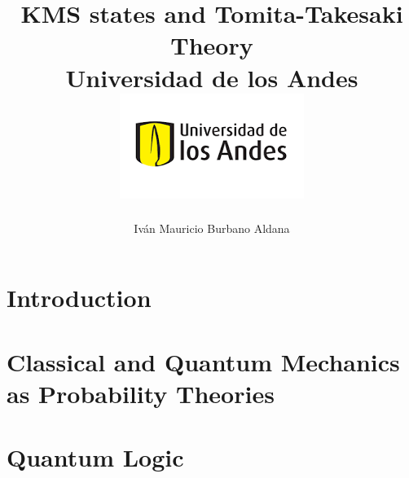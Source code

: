 \documentclass[12pt]{report}
\title 
{
	{KMS states and Tomita-Takesaki Theory}\\
	{\large Universidad de los Andes}\\
	{\includegraphics{logo.png}}	
}
\author{Iván Mauricio Burbano Aldana}
\theoremstyle{definition}
\begin{document}
	\maketitle

\chapter{Introduction}

\chapter{Classical and Quantum Mechanics as Probability Theories}


\chapter{Quantum Logic}




\end{document}
